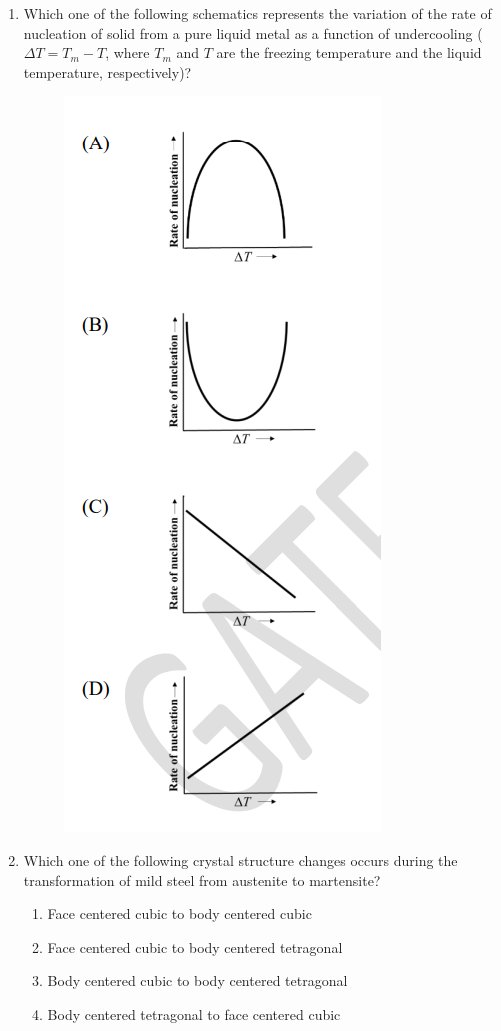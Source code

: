 \documentclass[journal]{IEEEtran}
\theoremstyle{remark}
\begin{document}
\begin{enumerate}[resume]
\item Which one of the following schematics represents the variation of the rate of nucleation of solid from a pure liquid metal as a function of undercooling ($\Delta T = T_m - T$, where $T_m$ and $T$ are the freezing temperature and the liquid temperature, respectively)? \hfill{}
\begin{figure}[H]
    \centering
    \includegraphics[width=0.4\columnwidth]{figs/Q.22.png}
    \caption{}
    \label{fig:placeholder}
\end{figure}

\item Which one of the following crystal structure changes occurs during the transformation of mild steel from austenite to martensite? \hfill{}
\begin{enumerate}
\item Face centered cubic to body centered cubic
\item Face centered cubic to body centered tetragonal
\item Body centered cubic to body centered tetragonal
\item Body centered tetragonal to face centered cubic
\end{enumerate}


\end{enumerate}
\end{document}
